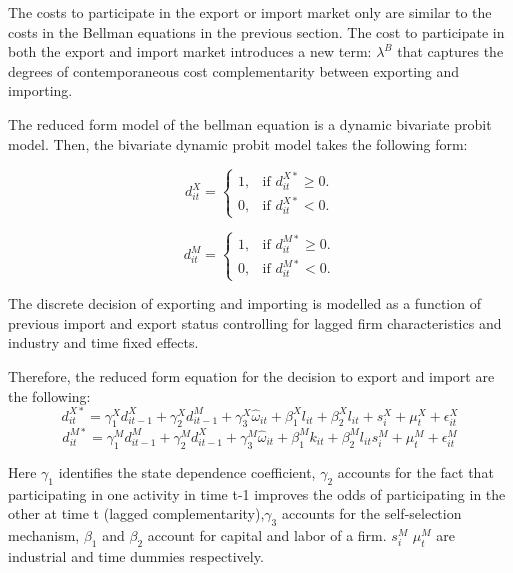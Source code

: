 \documentclass[12pt]{article}
\begin{document}
The costs to participate in the export or import market only are
similar to the costs in the Bellman equations in the previous
section. The cost to participate in both the export and import market
introduces a new term: $\lambda^B$  that captures the degrees of
contemporaneous cost complementarity between exporting and importing. 

The reduced form model of the bellman equation is a dynamic bivariate
probit model.  Then, the bivariate dynamic probit model  takes the following form:

\begin{equation}
  d_{it}^{X}=\begin{cases}
   1 , & \text{if $d_{it}^{X*}\geq 0$}.\\
   0 , & \text{if $d_{it}^{X*}<  0$}.
  \end{cases}
\end{equation}

\begin{equation}
  d_{it}^{M}=\begin{cases}
   1 , & \text{if $d_{it}^{M*} \geq  0$}.\\
   0 , & \text{if $d_{it}^{M*}<  0$}.
  \end{cases}
\end{equation}

The discrete decision of exporting and importing is modelled as a function of previous import and
export status controlling for lagged firm characteristics and industry and time fixed
effects. 

Therefore, the reduced form equation for the decision to export and
import are the following: 
\begin{equation}
d_{it}^{X*} = \gamma_{1}^{X} d_{it-1}^{X} + \gamma_{2}^{X} d_{it-1}^{M}+
\gamma_{3}^{X} \hat{\omega}_{it}  + \beta_{1}^{X}l_{it}  +\beta_{2}^{X}l_{it}+
s_{i}^{X} + \mu_{t}^{X}  + \epsilon_{it}^{X}
\end{equation}
\begin{equation}
d_{it}^{M*} = \gamma_{1}^{M} d_{it-1}^{M} + \gamma_{2}^{M} d_{it-1}^{X}+
\gamma_{3}^{M} \hat{\omega}_{it}  + \beta_{1}^{M}k_{it}  +\beta_{2}^{M}l_{it}
s_{i}^{M} + \mu_{t}^{M}  + \epsilon_{it}^{M}
\end{equation}

Here $\gamma_{1}$ identifies the state dependence coefficient, $\gamma_{2}$ accounts for
the fact that participating in one activity in time t-1 improves the
odds of participating in the other at time t (lagged complementarity),$\gamma_{3}$ accounts for
the self-selection mechanism, $\beta_{1}$ and $\beta_{2}$ account for
capital and labor of a firm.  $s_{i}^{M}$  $\mu_{t}^{M}$ are industrial
and time dummies respectively.
\end{document}
